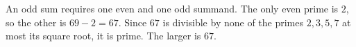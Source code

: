 An odd sum requires one even and one odd summand. The only even prime is $2$, so the other is $69-2=67$. Since $67$ is divisible by none of the primes $2,3,5,7$ at most its square root, it is prime. The larger is $\boxed{67}$.
